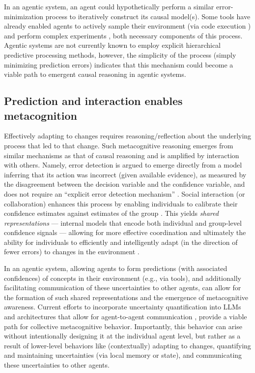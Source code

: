 \documentclass{article}
\theoremstyle{plain}
\theoremstyle{definition}
\theoremstyle{remark}
\begin{document}
In an agentic system, an agent could hypothetically perform a similar error-minimization process to iteratively construct its causal model(s). Some tools have already enabled agents to actively sample their environment (via code execution \cite{hu2024automated}) and perform complex experiments \cite{narayanan2024aviary,huang2024crispr}, both necessary components of this process. Agentic systems are not currently known to employ explicit hierarchical predictive processing methods, however, the simplicity of the process (simply minimizing prediction errors) indicates that this mechanism could become a viable path to emergent causal reasoning in agentic systems. 



\subsection{Prediction and interaction enables metacognition}


Effectively adapting to changes requires reasoning/reflection about the underlying process that led to that change. Such metacognitive reasoning emerges from similar mechanisms as that of causal reasoning and is amplified by interaction with others. Namely, error detection is argued to emerge directly from a model inferring that its action was incorrect (given available evidence), as measured by the disagreement between the decision variable and the confidence variable, and does not require an ``explicit error detection mechanism'' \cite{yeung2004neural, fleming2017self}. Social interaction (or collaboration) enhances this process by enabling individuals to calibrate their confidence estimates against estimates of the group \cite{bahrami2010optimally,bang2018distinct,surowiecki2004wisdom}. This yields \emph{shared representations} --- internal models that encode both individual and group-level confidence signals --- allowing for more effective coordination \cite{frith2012mechanisms,shea2014supra,wolf2023shared} and ultimately the ability for individuals to efficiently and intelligently adapt (in the direction of fewer errors) to changes in the environment \cite{wegner1987transactive,holland1992complex,hutchins1995cognition,simon2012architecture}.

In an agentic system, allowing agents to form predictions (with associated confidences) of concepts in their environment (e.g., via tools), and additionally facilitating communication of these uncertainties to other agents, can allow for the formation of such shared representations and the emergence of metacognitive awareness. Current efforts to incorporate uncertainty quantification into LLMs \cite{lin2023generating,balabanov2024uncertainty,shorinwa2024survey} and architectures that allow for agent-to-agent communication \cite{li2024survey}, provide a viable path for collective metacognitive behavior. Importantly, this behavior can arise without intentionally designing it at the individual agent level, but rather as a result of lower-level behaviors like (contextually) adapting to changes, quantifying and maintaining uncertainties (via local memory or state), and communicating these uncertainties to other agents.
\end{document}
